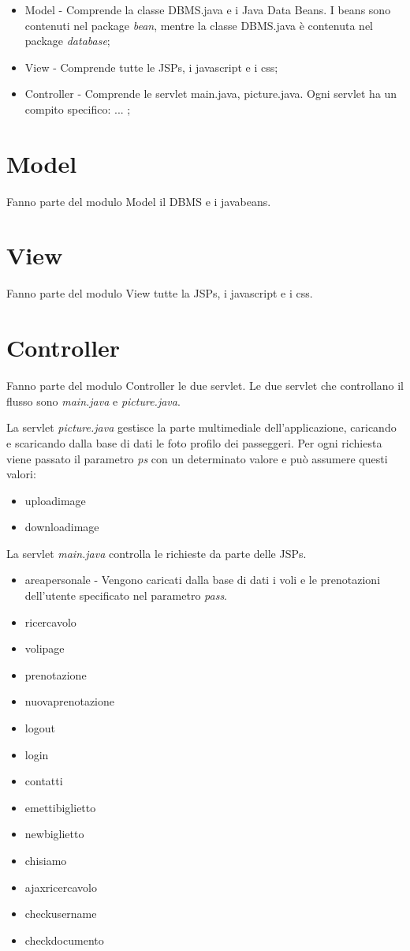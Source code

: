 \documentclass[a4paper,10pt]{article}
\begin{document}
\begin{itemize}
 \item Model - Comprende la classe DBMS.java e i Java Data Beans. I beans sono contenuti nel package \textit{bean}, mentre la classe DBMS.java \`e contenuta nel package \textit{database};
 \item View - Comprende tutte le JSPs, i javascript e i css;
 \item Controller - Comprende le servlet main.java, picture.java.  Ogni servlet ha un compito specifico: ... ;
\end{itemize}

\part{Model}
Fanno parte del modulo Model il DBMS e i javabeans. 
\part{View}
Fanno parte del modulo View tutte la JSPs, i javascript e i css.
\part{Controller}
Fanno parte del modulo Controller le due servlet. Le due servlet che controllano il flusso sono \textit{main.java} e \textit{picture.java}. 

La servlet \textit{picture.java} gestisce la parte multimediale dell'applicazione, caricando e scaricando dalla base di dati le foto profilo dei passeggeri.
Per ogni richiesta viene passato il parametro \textit{ps} con un determinato valore e pu\`o assumere questi valori:
\begin{itemize}
 \item uploadimage
 \item downloadimage
\end{itemize}

La servlet \textit{main.java} controlla le richieste da parte delle JSPs.

\begin{itemize}
 \item areapersonale - Vengono caricati dalla base di dati i voli e le prenotazioni dell'utente specificato nel parametro \textit{pass}.
 \item ricercavolo 
 \item volipage
 \item prenotazione
 \item nuovaprenotazione
 \item logout
 \item login
 \item contatti
 \item emettibiglietto
 \item newbiglietto
 \item chisiamo
 \item ajaxricercavolo
 \item checkusername
 \item checkdocumento
\end{itemize}
\end{document}
